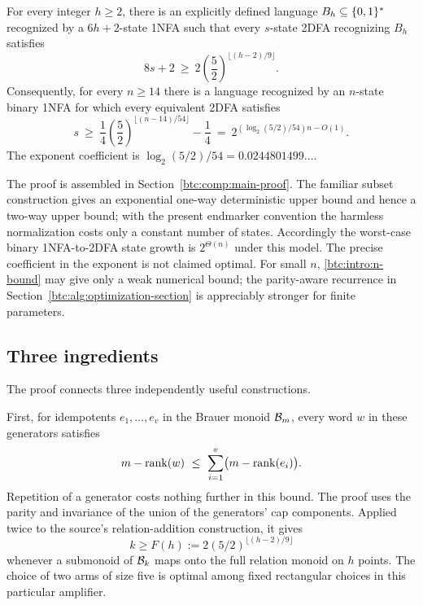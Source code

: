 \begin{theorem}\label{btc:intro:main}
For every integer $h\ge2$, there is an explicitly defined language
$B_h\subseteq\{0,1\}^*$ recognized by a $6h+2$-state 1NFA such that
every $s$-state 2DFA recognizing $B_h$ satisfies
\begin{equation}\label{btc:intro:h-bound}
 8s+2\ \ge\ 2\left(\frac52\right)^{\lfloor(h-2)/9\rfloor}.
\end{equation}
Consequently, for every $n\ge14$ there is a language recognized by
an $n$-state binary 1NFA for which every equivalent 2DFA satisfies
\begin{equation}\label{btc:intro:n-bound}
 s\ \ge\ \frac14\left(\frac52\right)^{\lfloor(n-14)/54\rfloor}
             -\frac14
   \ =\ 2^{(\log_2(5/2)/54)n-O(1)}.
\end{equation}
The exponent coefficient is
$\log_2(5/2)/54=0.0244801499\ldots$.
\end{theorem}

The proof is assembled in Section~\ref{btc:comp:main-proof}.
The familiar subset construction gives an exponential one-way
deterministic upper bound and hence a two-way upper bound; with
the present endmarker convention the harmless normalization costs
only a constant number of states. Accordingly the worst-case
binary 1NFA-to-2DFA state growth is $2^{\Theta(n)}$ under this model.
The precise coefficient in the exponent is not claimed optimal.
For small $n$, \eqref{btc:intro:n-bound} may give only a weak numerical
bound; the parity-aware recurrence in Section~\ref{btc:alg:optimization-section}
is appreciably stronger for finite parameters.

\subsection{Three ingredients}

The proof connects three independently useful constructions.

First, for idempotents $e_1,\ldots,e_v$ in the Brauer monoid
$\mathcal{B}_{m}$, every word $w$ in these generators satisfies
\[
 m-\rk(w)\ \le\ \sum_{i=1}^{v}\bigl(m-\rk(e_i)\bigr).
\]
Repetition of a generator costs nothing further in this bound.
The proof uses the parity and invariance of the union of the
generators' cap components. Applied twice to the source's
relation-addition construction, it gives
\[
 k\ge F(h):=2(5/2)^{\lfloor(h-2)/9\rfloor}
\]
whenever a submonoid of $\mathcal{B}_{k}$ maps onto the full relation
monoid on $h$ points. The choice of two arms of size five is
optimal among fixed rectangular choices in this particular
amplifier.


